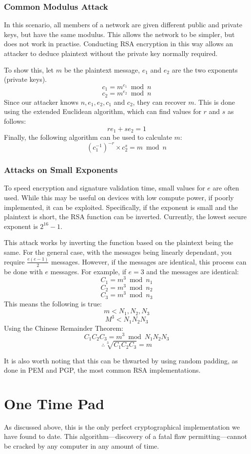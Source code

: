 			\subsubsection{Common Modulus Attack}
				In this scenario, all members of a network are given different public and private keys, but have the same modulus.
				This allows the network to be simpler, but does not work in practise. 
				Conducting RSA encryption in this way allows an attacker to deduce plaintext without the private key normally required. 

				To show this, let $m$ be the plaintext message, $e_1$ and $e_2$ are the two exponents (private keys). 
				\[c_1 = m^{e_1}\bmod{n}\]
				\[c_2 = m^{e_2}\bmod{n}\]
				Since our attacker knows $n, e_1, e_2, c_1$ and $c_2$, they can recover $m$. 
				This is done using the extended Euclidean algorithm, which can find values for $r$ and $s$ as follows:
				\[re_1 + se_2 = 1\]
				Finally, the following algorithm can be used to calculate $m$:
				\[(c^{-1}_{1})^{-r} \times c^{s}_{2} = m\bmod{n}\]

			\subsubsection{Attacks on Small Exponents}
				To speed encryption and signature validation time, small values for $e$ are often used. 
				While this may be useful on devices with low compute power, if poorly implemented, it can be exploited. 
				Specifically, if the exponent is small and the plaintext is short, the RSA function can be inverted. 
				Currently, the lowest secure exponent is $2^{16}-1$. 

				This attack works by inverting the function based on the plaintext being the same. 
				For the general case, with the messages being linearly dependant, you require $\frac{e(e-1)}{2}$ messages. 
				However, if the messages are identical, this process can be done with $e$ messages.
				For example, if $e = 3$ and the messages are identical:
				\[C_1 = m^3\bmod{n_1}\]
				\[C_2 = m^3\bmod{n_2}\]
				\[C_3 = m^3\bmod{n_3}\]
				This means the following is true:
				\[m < {N_1, N_2, N_3}\]
				\[M^3 < N_1N_2N_3\]
				Using the Chinese Remainder Theorem:
				\[C_1C_2C_3 = m^3\bmod{N_1N_2N_3}\]
				\[\therefore \sqrt[3]{C_1C_2C_3} = m\]

				It is also worth noting that this can be thwarted by using random padding, as done in PEM and PGP, the most common RSA implementations.  
	\section{One Time Pad}
		As discussed above, this is the only perfect cryptographical implementation we have found to date. 
		This algorithm---discovery of a fatal flaw permitting---cannot be cracked by any computer in any amount of time. 


